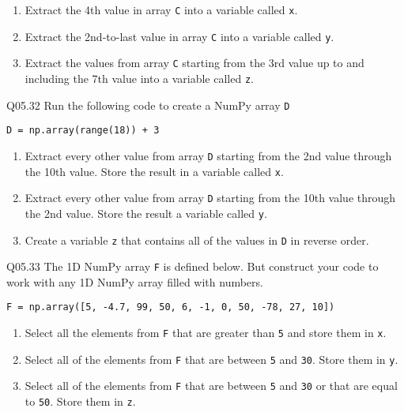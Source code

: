 \documentclass{book}
\newcommand{\passthrough}[1]{#1}
\begin{document}
\begin{enumerate}
\def\labelenumi{(\alph{enumi})}
\item
  Extract the 4th value in array \passthrough{\lstinline!C!} into a
  variable called \passthrough{\lstinline!x!}.
\item
  Extract the 2nd-to-last value in array \passthrough{\lstinline!C!}
  into a variable called \passthrough{\lstinline!y!}.
\item
  Extract the values from array \passthrough{\lstinline!C!} starting
  from the 3rd value up to and including the 7th value into a variable
  called \passthrough{\lstinline!z!}.
\end{enumerate}

Q05.32 Run the following code to create a NumPy array
\passthrough{\lstinline!D!}

\passthrough{\lstinline!D = np.array(range(18)) + 3!}

\begin{enumerate}
\def\labelenumi{(\alph{enumi})}
\item
  Extract every other value from array \passthrough{\lstinline!D!}
  starting from the 2nd value through the 10th value. Store the result
  in a variable called \passthrough{\lstinline!x!}.
\item
  Extract every other value from array \passthrough{\lstinline!D!}
  starting from the 10th value through the 2nd value. Store the result a
  variable called \passthrough{\lstinline!y!}.
\item
  Create a variable \passthrough{\lstinline!z!} that contains all of the
  values in \passthrough{\lstinline!D!} in reverse order.
\end{enumerate}

Q05.33 The 1D NumPy array \passthrough{\lstinline!F!} is defined below.
But construct your code to work with any 1D NumPy array filled with
numbers.

\passthrough{\lstinline!F = np.array([5, -4.7, 99, 50, 6, -1, 0, 50, -78, 27, 10])!}

\begin{enumerate}
\def\labelenumi{(\alph{enumi})}
\item
  Select all the elements from \passthrough{\lstinline!F!} that are
  greater than \passthrough{\lstinline!5!} and store them in
  \passthrough{\lstinline!x!}.
\item
  Select all of the elements from \passthrough{\lstinline!F!} that are
  between \passthrough{\lstinline!5!} and \passthrough{\lstinline!30!}.
  Store them in \passthrough{\lstinline!y!}.
\item
  Select all of the elements from \passthrough{\lstinline!F!} that are
  between \passthrough{\lstinline!5!} and \passthrough{\lstinline!30!}
  or that are equal to \passthrough{\lstinline!50!}. Store them in
  \passthrough{\lstinline!z!}.
\end{enumerate}
\end{document}
